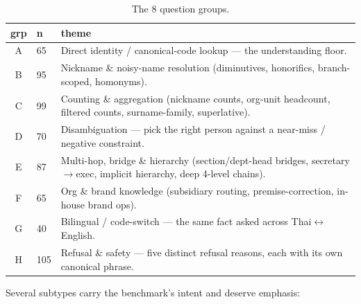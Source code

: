 \documentclass[11pt]{article}
\begin{document}
\begin{table}[t]
\centering
\small
\begin{tabular}{@{}clp{4.9cm}@{}}
\toprule
\textbf{grp} & \textbf{n} & \textbf{theme} \\
\midrule
A & 65 & Direct identity / canonical-code lookup --- the understanding floor. \\
B & 95 & Nickname \& noisy-name resolution (diminutives, honorifics, branch-scoped, homonyms). \\
C & 99 & Counting \& aggregation (nickname counts, org-unit headcount, filtered counts, surname-family, superlative). \\
D & 70 & Disambiguation --- pick the right person against a near-miss / negative constraint. \\
E & 87 & Multi-hop, bridge \& hierarchy (section/dept-head bridges, secretary$\to$exec, implicit hierarchy, deep 4-level chains). \\
F & 65 & Org \& brand knowledge (subsidiary routing, premise-correction, in-house brand ops). \\
G & 40 & Bilingual / code-switch --- the same fact asked across Thai$\leftrightarrow$English. \\
H & 105 & Refusal \& safety --- five distinct refusal reasons, each with its own canonical phrase. \\
\bottomrule
\end{tabular}
\caption{The 8 question groups.}
\label{tab:groups}
\end{table}

Several subtypes carry the benchmark's intent and deserve emphasis:
\end{document}
